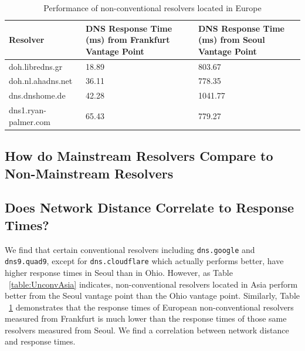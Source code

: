 \begin{table}[]
\begin{tabular}{lll}
\hline
\textbf{Resolver}    & \textbf{DNS Response Time (ms) from Frankfurt Vantage Point} & \textbf{DNS Response Time (ms) from Seoul Vantage Point} \\ \hline
doh.libredns.gr      & 18.89                                                        & 803.67                                          \\ \hline
doh.nl.ahadns.net    & 36.11                                                        & 778.35                                          \\ \hline
dns.dnshome.de       & 42.28                                                        & 1041.77                                         \\ \hline
dns1.ryan-palmer.com & 65.43                                                        & 779.27                                          \\ \hline
\end{tabular}
\caption{Performance of non-conventional resolvers located in Europe}
\label{table:UnconvEur}
\end{table}


\subsection{How do Mainstream Resolvers Compare to Non-Mainstream Resolvers}


\subsection{Does Network Distance Correlate to Response Times?}

We find that certain conventional resolvers including \texttt{dns.google} and \texttt{dns9.quad9}, except for \texttt{dns.cloudflare} which actually performs better, have higher response times in Seoul than in Ohio. 
However, as Table ~\ref{table:UnconvAsia} indicates, non-conventional resolvers located in Asia perform better from the Seoul vantage point than the Ohio vantage point. 
Similarly, Table ~\ref{table:UnconvEur} demonstrates that the response times of European non-conventional resolvers measured from Frankfurt is much lower than the response times of those same resolvers measured from Seoul. 
We find a correlation between network distance and response times. 




















